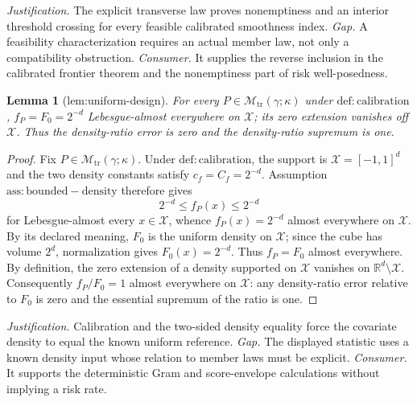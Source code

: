 \documentclass{article}
\newtheorem{lemma}{Lemma}
\begin{document}
\par\smallskip\noindent \textit{Justification.} The explicit transverse law proves nonemptiness and an interior threshold crossing for every feasible calibrated smoothness index. \textit{Gap.} A feasibility characterization requires an actual member law, not only a compatibility obstruction. \textit{Consumer.} It supplies the reverse inclusion in the calibrated frontier theorem and the nonemptiness part of risk well-posedness.

\begin{lemma}[lem:uniform-design]\label{lem:uniform-design}
For every \(P\in\mathcal M_{\mathrm{tr}}(\gamma;\kappa)\) under \(\mathrm{def:calibration}\), \(f_P=F_0=2^{-d}\) Lebesgue-almost everywhere on \(\mathcal X\); its zero extension vanishes off \(\mathcal X\). Thus the density-ratio error is zero and the density-ratio supremum is one.
\end{lemma}
\begin{proof}
Fix \(P\in\mathcal M_{\mathrm{tr}}(\gamma;\kappa)\). Under \(\mathrm{def:calibration}\), the support is \(\mathcal X=[-1,1]^d\) and the two density constants satisfy \(c_f=C_f=2^{-d}\). Assumption \(\mathrm{ass:bounded-density}\) therefore gives
\[
2^{-d}\le f_P(x)\le 2^{-d}
\]
for Lebesgue-almost every \(x\in\mathcal X\), whence \(f_P(x)=2^{-d}\) almost everywhere on \(\mathcal X\). By its declared meaning, \(F_0\) is the uniform density on \(\mathcal X\); since the cube has volume \(2^d\), normalization gives \(F_0(x)=2^{-d}\). Thus \(f_P=F_0\) almost everywhere. By definition, the zero extension of a density supported on \(\mathcal X\) vanishes on \(\mathbb R^d\setminus\mathcal X\). Consequently \(f_P/F_0=1\) almost everywhere on \(\mathcal X\): any density-ratio error relative to \(F_0\) is zero and the essential supremum of the ratio is one.
\end{proof}
\par\smallskip\noindent \textit{Justification.} Calibration and the two-sided density equality force the covariate density to equal the known uniform reference. \textit{Gap.} The displayed statistic uses a known density input whose relation to member laws must be explicit. \textit{Consumer.} It supports the deterministic Gram and score-envelope calculations without implying a risk rate.
\end{document}
